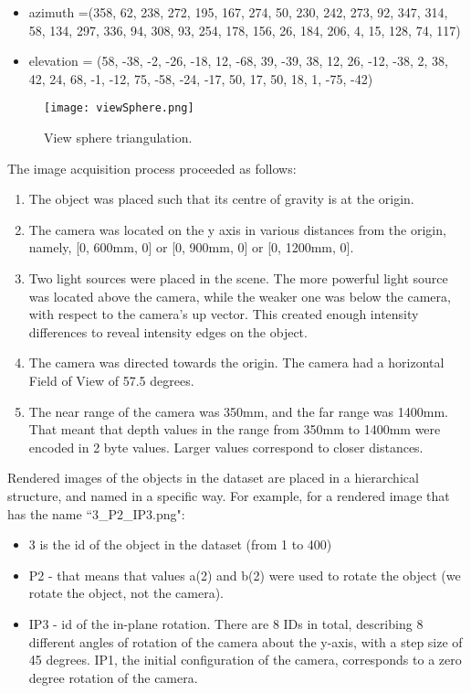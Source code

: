 \documentclass[a4paper,11pt,pdf]{../templates/pacmanreport}
\begin{document}
 
\begin{itemize}
\item azimuth =(358, 62, 238, 272, 195, 167, 274, 50, 230, 242, 273, 92, 347, 314, 58, 134, 297, 336, 94, 308, 93, 254, 178, 156, 26, 184, 206, 4, 15, 128, 74, 117)
\item elevation = (58, -38, -2, -26, -18, 12, -68, 39, -39, 38, 12, 26, -12, -38, 2, 38, 42, 24, 68, -1, -12, 75, -58, -24, -17, 50, 17, 50, 18, 1, -75, -42)
\end{itemize}

\begin{figure}[!h]
  \caption{View sphere triangulation.}
  \centering
    \texttt{[image: viewSphere.png]}
\label{viewSphere}
\end{figure}

The image acquisition process proceeded as follows:
\begin{enumerate}
\item The object was placed such that its centre of gravity is at the origin.
\item The camera was located on the y axis in various distances from the origin, namely, [0, 600mm, 0] or [0, 900mm, 0] or [0, 1200mm, 0].
\item Two light sources were placed in the scene. The more powerful light source was located above the camera, while the weaker one was below the camera, with respect to the camera's up vector. This created enough intensity differences to reveal intensity edges on the object. 
\item The camera was directed towards the origin. The camera had a horizontal Field of View of 57.5 degrees.
\item The near range of the camera was 350mm, and the far range was 1400mm. That meant that depth values in the range from 350mm to 1400mm were encoded in 2 byte values. Larger values correspond to closer distances.
\end{enumerate}

Rendered images of the objects in the dataset are placed in a hierarchical structure, and named in a specific way. For example, for a rendered image that has the name ``3\_P2\_IP3.png":
\begin{itemize}
\item 3 is the id of the object in the dataset (from 1 to 400)
\item P2 - that means that values a(2) and b(2) were used to rotate the object (we rotate the object, not the camera).
\item IP3 - id of the in-plane rotation. There are 8 IDs in total, describing 8 different angles of rotation of the camera about the y-axis, with a step size of 45 degrees. IP1, the initial configuration of the camera, corresponds to a zero degree rotation of the camera.
\end{itemize}
\end{document}
